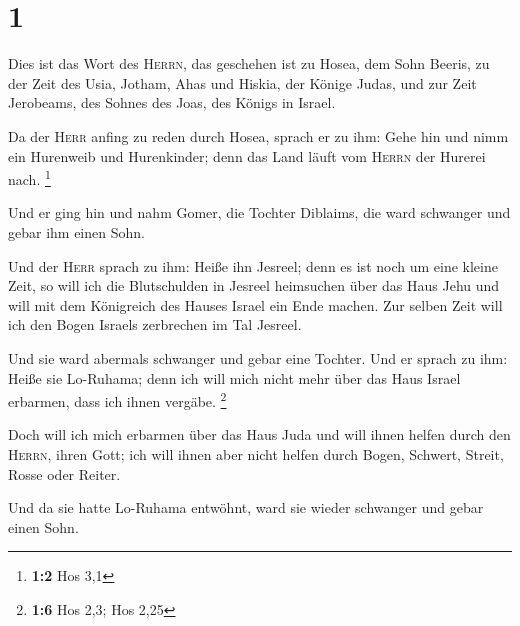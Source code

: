 \hypertarget{section}{%
\section{1}\label{section}}

 Dies ist das Wort des \textsc{Herrn}, das geschehen ist
zu Hosea, dem Sohn Beeris, zu der Zeit des Usia, Jotham, Ahas und
Hiskia, der Könige Judas, und zur Zeit Jerobeams, des Sohnes des Joas,
des Königs in Israel.

 Da der \textsc{Herr} anfing zu reden durch Hosea, sprach
er zu ihm: Gehe hin und nimm ein Hurenweib und Hurenkinder; denn das
Land läuft vom \textsc{Herrn} der Hurerei nach. \footnote{\textbf{1:2}
  Hos 3,1}

 Und er ging hin und nahm Gomer, die Tochter Diblaims, die
ward schwanger und gebar ihm einen Sohn.

 Und der \textsc{Herr} sprach zu ihm: Heiße ihn Jesreel;
denn es ist noch um eine kleine Zeit, so will ich die Blutschulden in
Jesreel heimsuchen über das Haus Jehu und will mit dem Königreich des
Hauses Israel ein Ende machen.  Zur selben Zeit will ich
den Bogen Israels zerbrechen im Tal Jesreel.

 Und sie ward abermals schwanger und gebar eine Tochter.
Und er sprach zu ihm: Heiße sie Lo-Ruhama; denn ich will mich nicht mehr
über das Haus Israel erbarmen, dass ich ihnen vergäbe. \footnote{\textbf{1:6}
  Hos 2,3; Hos 2,25}

 Doch will ich mich erbarmen über das Haus Juda und will
ihnen helfen durch den \textsc{Herrn}, ihren Gott; ich will ihnen aber
nicht helfen durch Bogen, Schwert, Streit, Rosse oder Reiter.

 Und da sie hatte Lo-Ruhama entwöhnt, ward sie wieder
schwanger und gebar einen Sohn.


